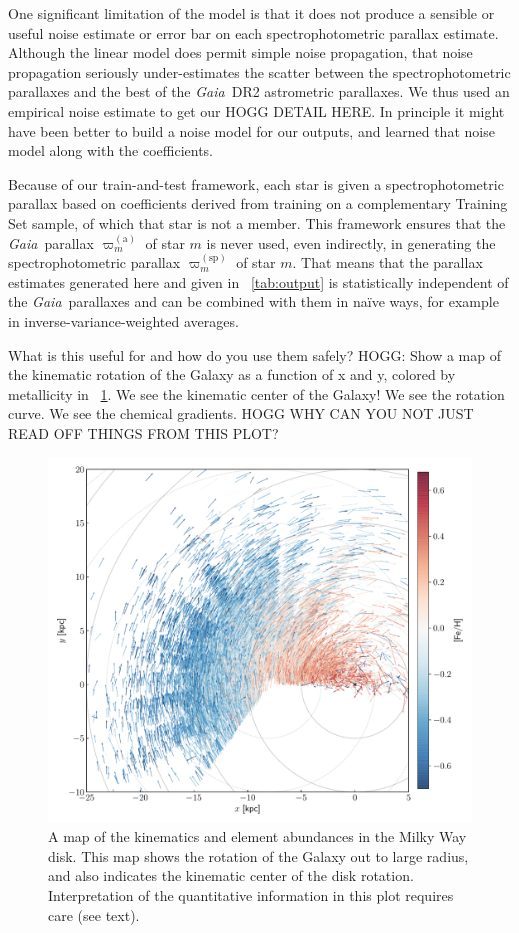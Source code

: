 \documentclass[modern]{aastex62}
\newcommand{\acronym}[1]{{\small{#1}}}
\newcommand{\project}[1]{\textsl{#1}}
\newcommand{\gaia}{\project{Gaia}}
\newcommand{\gparallax}{\varpi^{(\mathrm{a})}}
\newcommand{\sparallax}{\varpi^{(\mathrm{sp})}}
\begin{document}
One significant limitation of the model is that it does not produce a sensible or
useful noise estimate or error bar on each spectrophotometric parallax estimate.
Although the linear model does permit simple noise propagation, that noise propagation
seriously under-estimates the scatter between the spectrophotometric parallaxes
and the best of the \gaia\ \acronym{DR2} astrometric parallaxes.
We thus used an empirical noise estimate to get our HOGG DETAIL HERE.
In principle it might have been better to build a noise model for our outputs,
and learned that noise model along with the coefficients.

Because of our train-and-test framework, each star is given a spectrophotometric
parallax based on coefficients derived from training on a complementary Training Set sample, of
which that star is not a member.
This framework ensures that the \gaia\ parallax $\gparallax_m$ of star $m$ is never used,
even indirectly, in generating the spectrophotometric parallax $\sparallax_m$ of star $m$.
That means that the parallax estimates generated here and given in \tablename~\ref{tab:output}
is statistically independent of the \gaia\ parallaxes and can be combined with them in
na\"ive ways, for example in inverse-variance-weighted averages.

What is this useful for and how do you use them safely?
HOGG: Show a map of the kinematic rotation of the Galaxy as a function of
x and y, colored by metallicity in \figurename~\ref{fig:disk}.
We see the kinematic center of the Galaxy! We see the rotation curve.
We see the chemical gradients. HOGG WHY CAN YOU NOT JUST READ OFF THINGS FROM THIS PLOT?
\begin{figure}
\includegraphics[width=\textwidth]{map.pdf}
\caption{A map of the kinematics and element abundances in the Milky Way disk.
  This map shows the rotation of the Galaxy out to large radius, and also
  indicates the kinematic center of the disk rotation. Interpretation of
  the quantitative information in this plot requires care (see text).\label{fig:disk}}
\end{figure}
\end{document}
